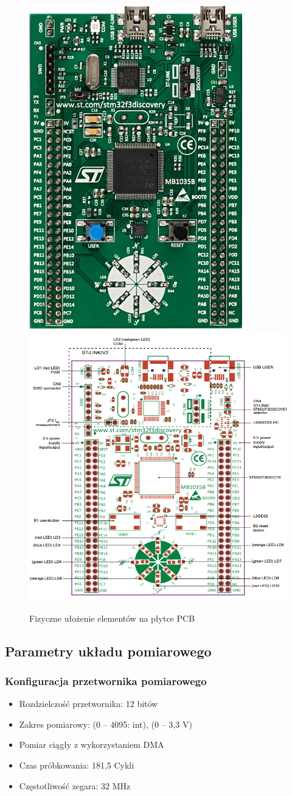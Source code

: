 \documentclass[10pt,a4paper]{article}
\begin{document}
\begin{figure}[!htb]
\centering
\subfloat
{
\includegraphics[height=0.6\textwidth]{32f3discovery.jpg}
}
\subfloat
{
\includegraphics[height=0.6\textwidth]{stm32f3layout.png}
}
\caption{Fizyczne ułożenie elementów na płytce PCB\label{fig:layout}}
\end{figure}

\newpage
\subsection{Parametry układu pomiarowego}
\subsubsection{Konfiguracja przetwornika pomiarowego}
\begin{itemize}
\item Rozdzielczość przetwornika: 12 bitów
\item Zakres pomiarowy: (0 -- 4095: int), (0 -- 3,3 V)
\item Pomiar ciągły z wykorzystaniem DMA
\item Czas próbkowania: 181,5 Cykli
\item Częstotliwość zegara: 32 MHz
\end{itemize}
\end{document}
